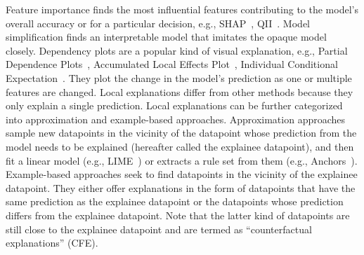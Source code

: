 Feature importance finds the most influential features contributing to the model's overall accuracy or for a particular decision, e.g., SHAP~\cite{shap-paper}, QII~\cite{QII_SA1}. 
Model simplification finds an interpretable model that imitates the opaque model closely. 
Dependency plots are a popular kind of visual explanation, e.g., Partial Dependence Plots~\citep{intro_PDP}, Accumulated Local Effects Plot~\citep{intro_ALE}, Individual Conditional Expectation~\citep{ICE_PDP1}. 
They plot the change in the model's prediction as one or multiple features are changed. 
Local explanations differ from other methods because they only explain a single prediction. 
Local explanations can be further categorized into approximation and example-based approaches. 
Approximation approaches sample new datapoints in the vicinity of the datapoint whose prediction from the model needs to be explained (hereafter called the explainee datapoint), and then fit a linear model (e.g., LIME~\citep{ribeiro_why_2016}) or extracts a rule set from them (e.g., Anchors~\citep{Ribeiro2018Anchors}).
Example-based approaches seek to find datapoints in the vicinity of the explainee datapoint. 
They either offer explanations in the form of datapoints that have the same prediction as the explainee datapoint or the datapoints whose prediction differs from the explainee datapoint. 
Note that the latter kind of datapoints are still close to the explainee datapoint and are termed as ``counterfactual explanations'' (CFE). 

